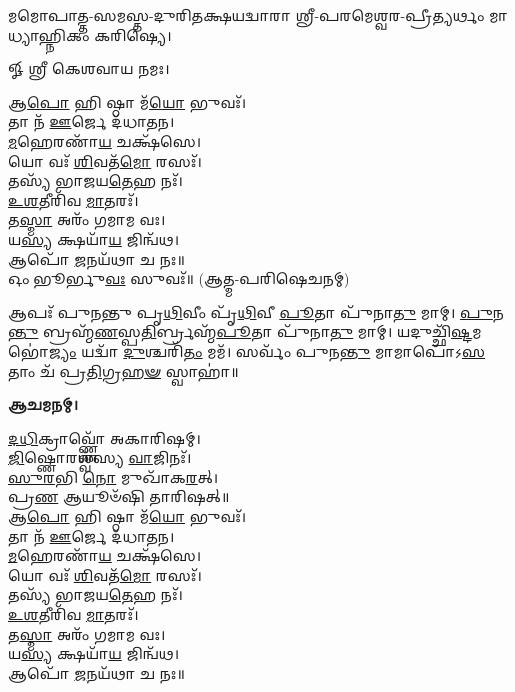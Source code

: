 
𑌮𑌮𑍋𑌪𑌾𑌤𑍍𑌤-𑌸𑌮𑌸𑍍𑌤-𑌦𑍁𑌰𑌿𑌤𑌕𑍍𑌷𑌯𑌦𑍍𑌵𑌾𑌰𑌾 𑌶𑍍𑌰𑍀-𑌪𑌰𑌮𑍇𑌶𑍍𑌵𑌰-𑌪𑍍𑌰𑍀𑌤𑍍𑌯𑌰𑍍𑌥𑌂 𑌮𑌾𑌧𑍍𑌯𑌾𑌹𑍍𑌨𑌿𑌕𑌂 𑌕𑌰𑌿𑌷𑍍𑌯𑍇।


𑍐 𑌶𑍍𑌰𑍀 𑌕𑍇𑌶𑌵𑌾𑌯 𑌨𑌮𑌃।

𑌆\-\ul{𑌪𑍋} 𑌹𑌿 𑌷𑍍𑌠𑌾 𑌮᳴\-\ul{𑌯𑍋} 𑌭𑍁𑌵𑌃᳴।\\
𑌤𑌾 𑌨᳴ \ul{𑌊}\-𑌰𑍍𑌜𑍇 𑌦᳴𑌧𑌾𑌤𑌨।\\
\-\ul{𑌮}\-𑌹𑍇𑌰𑌣𑌾᳴\-\ul{𑌯} 𑌚𑌕𑍍𑌷᳴𑌸𑍇।\\
𑌯𑍋 𑌵𑌃᳴ \ul{𑌶𑌿}\-𑌵𑌤᳴\-\ul{𑌮𑍋} 𑌰𑌸𑌃᳴।\\
𑌤𑌸𑍍𑌯᳴ 𑌭𑌾𑌜𑌯\-\ul{𑌤𑍇}\-𑌹 𑌨𑌃᳴।\\
\-\ul{𑌉}\-\-\ul{𑌶}\-𑌤𑍀𑌰𑌿᳴𑌵 \ul{𑌮𑌾}\-𑌤𑌰𑌃᳴।\\
𑌤\-\ul{𑌸𑍍𑌮𑌾} 𑌅𑌰𑌂᳴ 𑌗𑌮𑌾𑌮 𑌵𑌃।\\
𑌯\-\ul{𑌸𑍍𑌯} 𑌕𑍍𑌷𑌯𑌾᳴\-\ul{𑌯} 𑌜𑌿𑌨𑍍𑌵᳴𑌥।\\
𑌆𑌪𑍋᳴ \ul{𑌜}\-𑌨𑌯᳴𑌥𑌾 𑌚 𑌨𑌃॥\\

𑌓𑌂 𑌭𑍂𑌰𑍍𑌭𑍁\-\ul{𑌵𑌃} 𑌸𑍁𑌵𑌃᳴॥ (𑌆𑌤𑍍𑌮-𑌪𑌰𑌿𑌷𑍇𑌚𑌨𑌮𑍍)


𑌆𑌪𑌃᳴ 𑌪𑍁𑌨𑌨𑍍𑌤𑍁 𑌪𑍃\-\ul{𑌥𑌿}\-𑌵𑍀𑌂 𑌪𑍃᳴\-\ul{𑌥𑌿}\-𑌵𑍀 \ul{𑌪𑍂}\-𑌤𑌾 𑌪𑍁᳴𑌨𑌾\-\ul{𑌤𑍁} 𑌮𑌾𑌮𑍍। \ul{𑌪𑍁}\-𑌨\-\ul{𑌨𑍍𑌤𑍁} 𑌬𑍍𑌰𑌹𑍍𑌮᳴\-\ul{𑌣}\-𑌸𑍍𑌪\-\ul{𑌤𑌿}\-𑌰𑍍𑌬𑍍𑌰𑌹𑍍𑌮᳴\-\ul{𑌪𑍂}\-𑌤𑌾 𑌪𑍁᳴𑌨𑌾\-\ul{𑌤𑍁} 𑌮𑌾𑌮𑍍। 𑌯𑌦𑍁𑌚𑍍𑌛𑌿᳴\-\ul{𑌷𑍍𑌟}\-𑌮𑌭𑍋॑\-\ul{𑌜𑍍𑌯𑌂} 𑌯𑌦𑍍𑌵𑌾᳴ \ul{𑌦𑍁}\-𑌶𑍍𑌚𑌰𑌿᳴\-\ul{𑌤𑌂} 𑌮𑌮᳴। 𑌸𑌰𑍍𑌵𑌂᳴ 𑌪𑍁𑌨\-\ul{𑌨𑍍𑌤𑍁} 𑌮𑌾𑌮𑌾𑌪𑍋᳴𑌽\-\ul{𑌸}\-𑌤𑌾𑌂 𑌚᳴ 𑌪𑍍𑌰\-\ul{𑌤𑌿}\-𑌗𑍍𑌰\-\ul{𑌹}\-\-\ul{𑍟} 𑌸𑍍𑌵𑌾𑌹𑌾॑॥


\textbf{𑌆𑌚𑌮𑌨𑌮𑍍।}

\-\ul{𑌦}\-\-\ul{𑌧𑌿}\-𑌕𑍍𑌰𑌾𑌵𑍍𑌣𑍍𑌣𑍋᳴ 𑌅𑌕𑌾𑌰𑌿𑌷𑌮𑍍।\\
 \ul{𑌜𑌿}\-𑌷𑍍𑌣𑍋𑌰𑌶𑍍𑌵᳴𑌸𑍍𑌯 \ul{𑌵𑌾}\-𑌜𑌿𑌨𑌃᳴।\\
\-\ul{𑌸𑍁}\-\-\ul{𑌰}\-𑌭𑌿 \ul{𑌨𑍋} 𑌮𑍁𑌖𑌾᳴𑌕\-\ul{𑌰}\-𑌤𑍍।\\
𑌪𑍍𑌰\-\ul{𑌣} 𑌆𑌯𑍂𑍞᳴𑌷𑌿 𑌤𑌾𑌰𑌿𑌷𑌤𑍍॥\\



𑌆\-\ul{𑌪𑍋} 𑌹𑌿 𑌷𑍍𑌠𑌾 𑌮᳴\-\ul{𑌯𑍋} 𑌭𑍁𑌵𑌃᳴।\\
𑌤𑌾 𑌨᳴ \ul{𑌊}\-𑌰𑍍𑌜𑍇 𑌦᳴𑌧𑌾𑌤𑌨।\\
\-\ul{𑌮}\-𑌹𑍇𑌰𑌣𑌾᳴\-\ul{𑌯} 𑌚𑌕𑍍𑌷᳴𑌸𑍇।\\
𑌯𑍋 𑌵𑌃᳴ \ul{𑌶𑌿}\-𑌵𑌤᳴\-\ul{𑌮𑍋} 𑌰𑌸𑌃᳴।\\
𑌤𑌸𑍍𑌯᳴ 𑌭𑌾𑌜𑌯\-\ul{𑌤𑍇}\-𑌹 𑌨𑌃᳴।\\
\-\ul{𑌉}\-\-\ul{𑌶}\-𑌤𑍀𑌰𑌿᳴𑌵 \ul{𑌮𑌾}\-𑌤𑌰𑌃᳴।\\
𑌤\-\ul{𑌸𑍍𑌮𑌾} 𑌅𑌰𑌂᳴ 𑌗𑌮𑌾𑌮 𑌵𑌃।\\
𑌯\-\ul{𑌸𑍍𑌯} 𑌕𑍍𑌷𑌯𑌾᳴\-\ul{𑌯} 𑌜𑌿𑌨𑍍𑌵᳴𑌥।\\
𑌆𑌪𑍋᳴ \ul{𑌜}\-𑌨𑌯᳴𑌥𑌾 𑌚 𑌨𑌃॥\\

